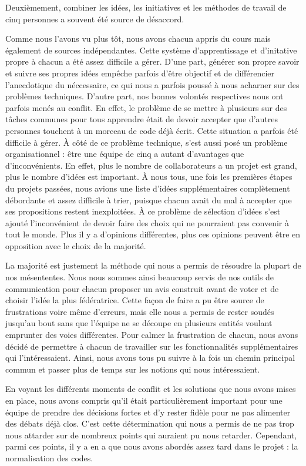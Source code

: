 \documentclass[12pt]{report}
\begin{document}
        \bigskip
        \par
        Deuxièmement, combiner les idées, les initiatives et les méthodes de travail de cinq personnes a souvent été source de désaccord.
        \par
        Comme nous l’avons vu plus tôt, nous avons chacun appris du cours mais également de sources indépendantes. Cette système d’apprentissage et d’initative propre à chacun a été assez difficile a gérer. D’une part, générer son propre savoir et suivre ses propres idées empêche parfois d’être objectif et de différencier l’anecdotique du néccessaire, ce qui nous a parfois poussé à nous acharner sur des problèmes techniques. D’autre part, nos bonnes volontés respectives nous ont parfois menés au conflit. En effet, le problème de se mettre à plusieurs sur des tâches communes pour tous apprendre était de devoir accepter que d’autres personnes touchent à un morceau de code déjà écrit. Cette situation a parfois été difficile à gérer. À côté de ce problème technique, s’est aussi posé un problème organisationnel : être une équipe de cinq a autant d’avantages que d’inconvénients. En effet, plus le nombre de collaborateurs a un projet est grand, plus le nombre d’idées est important. À nous tous, une fois les premières étapes du projets passées, nous avions une liste d’idées supplémentaires complètement débordante et assez difficile à trier, puisque chacun avait du mal à accepter que ses propositions restent inexploitées. À ce problème de sélection d’idées s’est ajouté l’inconvénient de devoir faire des choix qui ne pourraient pas convenir à tout le monde. Plus il y a d’opinions différentes, plus ces opinions peuvent être en opposition avec le choix de la majorité.
        \par
        La majorité est justement la méthode qui nous a permis de résoudre la plupart de nos mésententes. Nous nous sommes ainsi beaucoup servis de nos outils de communication pour chacun proposer un avis construit avant de voter et de choisir l’idée la plus fédératrice. Cette façon de faire a pu être source de frustrations voire même d’erreurs, mais elle nous a permis de rester soudés jusqu’au bout sans que l’équipe ne se découpe en plusieurs entités voulant emprunter des voies différentes. Pour calmer la frustration de chacun, nous avons décidé de permettre à chacun de travailler sur les fonctionnalités supplémentaires qui l’intéressaient. Ainsi, nous avons tous pu suivre à la fois un chemin principal commun et passer plus de temps sur les notions qui nous intéressaient.
        \par
        En voyant les différents moments de conflit et les solutions que nous avons mises en place, nous avons compris qu’il était particulièrement important pour une équipe de prendre des décisions fortes et d’y rester fidèle pour ne pas alimenter des débats déjà clos. C’est cette détermination qui nous a permis de ne pas trop nous attarder sur de nombreux points qui auraient pu nous retarder. Cependant, parmi ces points, il y a en a que nous avons abordés assez tard dans le projet : la normalisation des codes.
        
\end{document}
